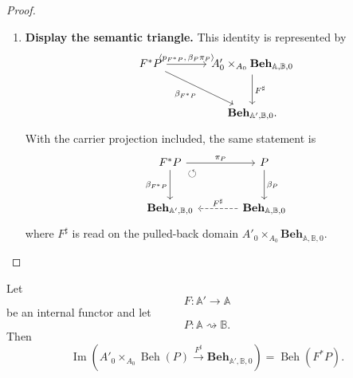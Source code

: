 \begin{proof}
\begin{enumerate}
        \item \textbf{Display the semantic triangle.}
        This identity is represented by
        \[
        \begin{tikzcd}[column sep=large, row sep=large]
            F^*P
                \arrow[r, "{\langle p_{F^*P},\,\beta_P\pi_P\rangle}"]
                \arrow[dr, "\beta_{F^*P}"']
            &
            A'_0\times_{A_0}\mathbf{Beh}_{\mathbb A,\mathbb B,0}
                \arrow[d, "F^\sharp"]
            \\
            &
            \mathbf{Beh}_{\mathbb A',\mathbb B,0}.
        \end{tikzcd}
        \]
        With the carrier projection included, the same statement is
        \[
        \begin{tikzcd}[column sep=large, row sep=large]
            F^*P
                \arrow[r, "\pi_P"]
                \arrow[d, "\beta_{F^*P}"']
                \arrow[dr, phantom, "\circlearrowleft", very near start]
            &
            P
                \arrow[d, "\beta_P"]
            \\
            \mathbf{Beh}_{\mathbb A',\mathbb B,0}
            &
            \mathbf{Beh}_{\mathbb A,\mathbb B,0}
                \arrow[l, dashed, "F^\sharp"']
        \end{tikzcd}
        \]
        where \(F^\sharp\) is read on the pulled-back domain
        \(A'_0\times_{A_0}\mathbf{Beh}_{\mathbb A,\mathbb B,0}\).
    \end{enumerate}
\end{proof}

\begin{lemma}
\label{lem:input-pullback-semantic-images}
    Let
    \[
        F:\mathbb A'\to\mathbb A
    \]
    be an internal functor and let
    \[
        P:\mathbb A\rightsquigarrow\mathbb B.
    \]
    Then
    \[
        \operatorname{Im}
        \left(
            A'_0\times_{A_0}\operatorname{Beh}(P)
            \xrightarrow{F^\sharp}
            \mathbf{Beh}_{\mathbb A',\mathbb B,0}
        \right)
        =
        \operatorname{Beh}(F^*P).
    \]
\end{lemma}

